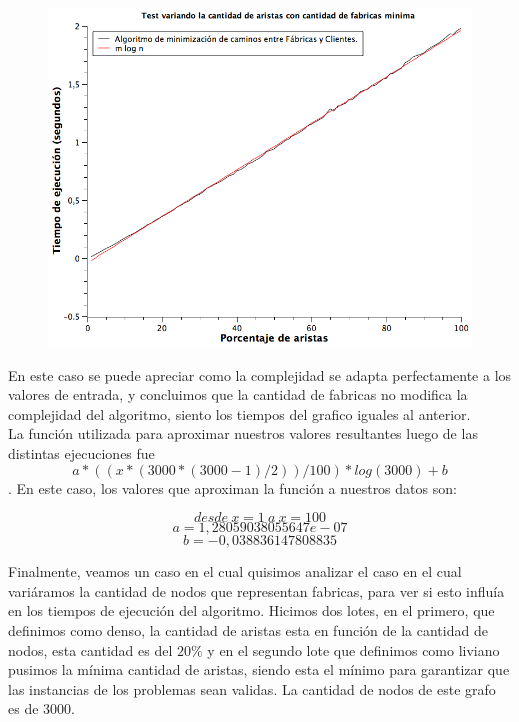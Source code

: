 \begin{figure}[H]
	\includegraphics[width=350pt]{../tests/ej3/EJ3-r-var-liviano.png}
\end{figure}

En este caso se puede apreciar como la complejidad se adapta perfectamente a los valores de entrada, y concluimos que la cantidad de fabricas no modifica la complejidad del algoritmo, siento los tiempos del grafico iguales al anterior.\\
La función utilizada para aproximar nuestros valores resultantes luego de las distintas ejecuciones fue $$ a*((x*(3000*(3000-1)/2))/100)*log(3000)+b$$.
En este caso, los valores que aproximan la función a nuestros datos son:

$$desde\ x = 1\ a\ x = 100$$
$$a  = 1,28059038055647e-07$$
$$b  = -0,038836147808835$$

\newpage 
Finalmente, veamos un caso en el cual quisimos analizar el caso en el cual variáramos la cantidad de nodos que representan fabricas, para ver si esto influía en los tiempos de ejecución del algoritmo. Hicimos dos lotes, en el primero, que definimos como denso, la cantidad de aristas esta en función de la cantidad de nodos, esta cantidad es del $20\%$ y en el segundo lote que definimos como liviano pusimos la mínima cantidad de aristas, siendo esta el mínimo para garantizar que las instancias de los problemas sean validas. La cantidad de nodos de este grafo es de $3000$.

